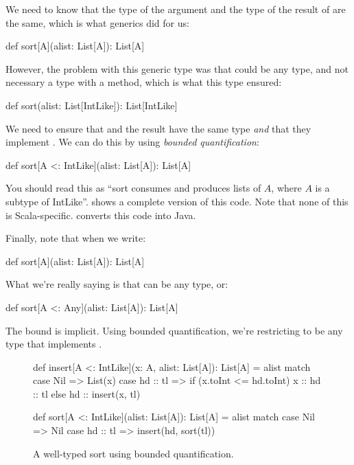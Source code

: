 \documentclass[9pt]{extbook}
\begin{document}
We need to know that the type of the argument and the type of the result
of  are the same, which is what generics did for us:
%
\begin{scalacode}
def sort[A](alist: List[A]): List[A]
\end{scalacode}
However, the problem with this generic type was that  could
be any type, and not necessary a type with a  method,
which is what this type ensured:
\begin{scalacode}
def sort(alist: List[IntLike]): List[IntLike]
\end{scalacode}
We need to
ensure that  and the result have the same type \emph{and}
that they implement . We can do this by using
\emph{bounded quantification}:
\begin{scalacode}
def sort[A <: IntLike](alist: List[A]): List[A]
\end{scalacode}
You should read this as ``sort consumes and produces lists of $A$, where $A$
is a subtype of IntLike''.  shows a complete version of this code.
Note that none of this is Scala-specific.  converts
this code into Java.

Finally, note that when we write:
\begin{scalacode}
def sort[A](alist: List[A]): List[A]
\end{scalacode}
What we're really saying is that  can be any type, or:
%
\begin{scalacode}
def sort[A <: Any](alist: List[A]): List[A]
\end{scalacode}
%
The bound  is implicit. Using bounded quantification, we're restricting  to be any
type that implements .

\begin{figure}
\begin{scalacode}
def insert[A <: IntLike](x: A, alist: List[A]): List[A] = alist match {
  case Nil => List(x)
  case hd :: tl => if (x.toInt <= hd.toInt) { x :: hd :: tl } else { hd :: insert(x, tl) }
}

def sort[A <: IntLike](alist: List[A]): List[A] = alist match {
  case Nil => Nil
  case hd :: tl => insert(hd, sort(tl))
}
\end{scalacode}
\caption{A well-typed sort using bounded quantification.}
\label{sort_bq}
\end{figure}
\end{document}
